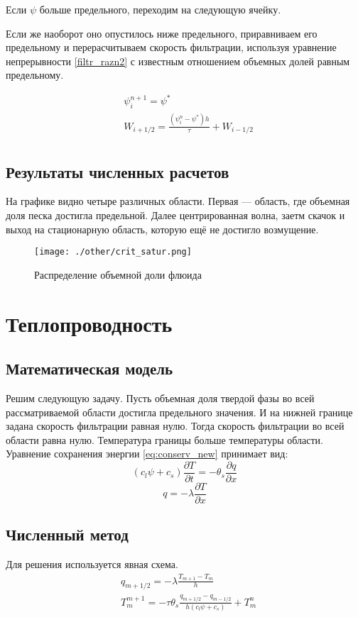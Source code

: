 \documentclass[12pt,a4paper]{article}
\newcommand{\pd}[2]{\frac{\partial #1}{\partial #2}}
\begin{document}
Если $\psi$ больше предельного, переходим на следующую ячейку.

Если же наоборот оно опустилось ниже предельного, приравниваем его предельному и перерасчитываем скорость фильтрации, используя уравнение непрерывности \eqref{filtr_razn2} с известным отношением объемных долей равным предельному.

\begin{equation}
\begin{aligned} 
&\psi_{i}^{n+1} = \psi^* \\
&W_{i+1/2} = \frac{(\psi_i^n - \psi^*)h}{\tau} + W_{i-1/2} \\
\end{aligned}
\label{corr_razn}
\end{equation}

\subsection{Результаты численных расчетов}
На графике видно четыре различных области. Первая --- область, где объемная доля песка достигла предельной. Далее центрированная волна, заетм скачок и выход на стационарную область, которую ещё не достигло возмущение. 
\begin{figure}[h!]
\begin{center}
\texttt{[image: ./other/crit\_satur.png]}
\caption{Распределение объемной доли флюида}
\end{center}
\end{figure}
\newpage
\section{Теплопроводность}
\subsection{Математическая модель}
Решим следующую задачу. 
Пусть объемная доля твердой фазы во всей рассматриваемой области достигла предельного значения. И на нижней границе задана скорость фильтрации равная нулю. Тогда скорость фильтрации во всей области равна нулю. Температура границы больше температуры области. Уравнение сохранения энергии \eqref{eq:conserv_new} принимает вид:
$$
(c_l \psi + c_s)\pd{T}{t} =-\theta_s \pd{q}{x}
$$
$$
q = -\lambda\pd{T}{x}
$$

\subsection{Численный метод}
Для решения используется явная схема.
\begin{equation}
\begin{aligned}
&q_{m+1/2} = - \lambda\frac{T_{m+1} - T_m}{h}\\
&T_m^{m+1} = - \tau \theta_s\frac{q_{m+1/2} - q_{m-1/2}}{h(c_l \psi + c_s)} + T_m^n\\
\label{termal_razn}
\end{aligned}
\end{equation}
\end{document}

